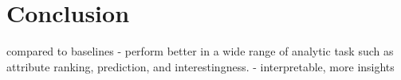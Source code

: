 \section{Conclusion}

\system compared to baselines
- perform better in a wide range of analytic task such as attribute ranking, prediction, and interestingness. 
- interpretable, more insights